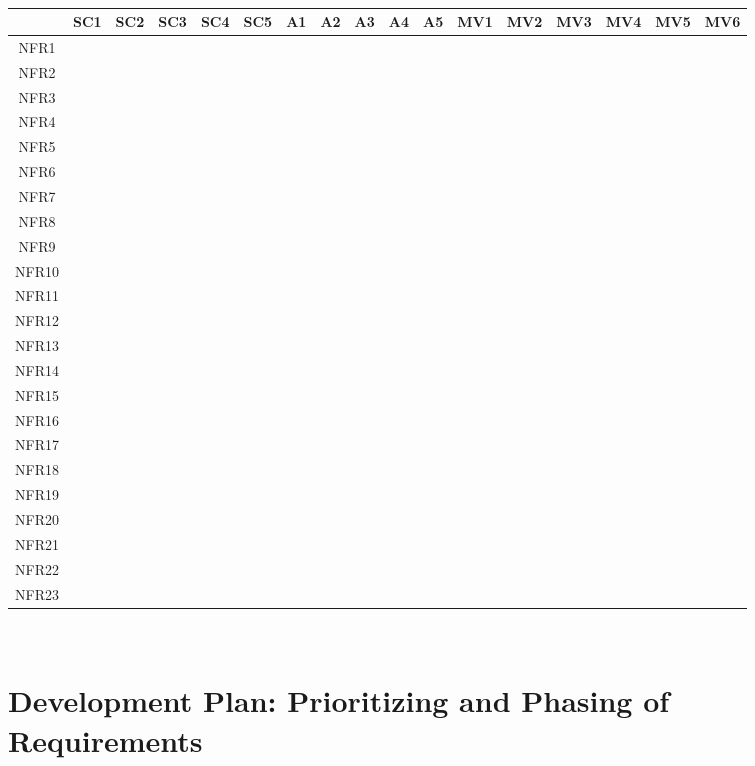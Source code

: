 \documentclass[12pt]{article}
\begin{document}
~\newpage
\begin{minipage}{\textwidth}
\renewcommand*{\arraystretch}{1.5}
\begin{tabular}{| c | c | c | c |c | c | c | c |c | c | c | c |c|c|c|c|c|}
 \hline
 &SC1 &SC2  & SC3 &  SC4& SC5&A1&A2&A3&A4&A5&MV1&MV2&MV3&MV4&MV5&MV6\\ 
 \hline
NFR1& &  &  &  & &&&&&&&&&&&\\ 
  \hline
NFR2 & &  &  &  & &&&&&&&&&&&\\ 
  \hline
NFR3 & &  &  &  & &&&&&&&&&&&\\ 
  \hline
NFR4& &  &  &  & &&&&&&&&&&&\\ 
  \hline
NFR5& &  &  &  & &&&&&&&&&&&\\ 
  \hline
NFR6& &  &  &  & &&&&&&&&&&&\\ 
 \hline
NFR7  & &  &  &  & &&&&&&&&&&&\\ 
 \hline
NFR8& &  &  &  & &&&&&&&&&&&\\ 
  \hline
NFR9 & &  &  &  & &&&&&&&&&&&\\ 
  \hline
NFR10 & &  &  &  & &&&&&&&&&&&\\ 
  \hline
NFR11& &  &  &  & &&&&&&&&&&&\\ 
  \hline
NFR12& &  &  &  & &&&&&&&&&&&\\ 
  \hline
NFR13& &  &  &  & &&&&&&&&&&&\\ 
 \hline
NFR14  & &  &  &  & &&&&&&&&&&&\\ 
 \hline
NFR15& &  &  &  & &&&&&&&&&&&\\ 
  \hline
NFR16 & &  &  &  & &&&&&&&&&&&\\ 
  \hline
NFR17 & &  &  &  & &&&&&&&&&&&\\ 
  \hline
NFR18& &  &  &  & &&&&&&&&&&&\\ 
  \hline
NFR19& &  &  &  & &&&&&&&&&&&\\ 
  \hline
NFR20& &  &  &  & &&&&&&&&&&&\\ 
 \hline
NFR21  & &  &  &  & &&&&&&&&&&&\\ 
 \hline
NFR22& &  &  &  & &&&&&&&&&&&\\ 
  \hline
NFR23 & &  &  &  & &&&&&&&&&&&\\ 
\hline
\end{tabular}
\end{minipage}\\

\section{Development Plan: Prioritizing and Phasing of Requirements}
\end{document}
